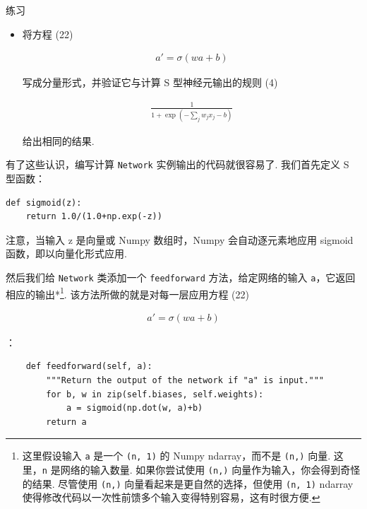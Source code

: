 \begin{exerciseBox}{练习}

\begin{itemize}

\item
将方程 (22)

\begin{align*}
a' = \sigma(w a + b) \nonumber
\end{align*}

写成分量形式，并验证它与计算 S 型神经元输出的规则 (4)

\begin{align*}
\frac{1}{1+\exp(-\sum_j w_j x_j-b)} \nonumber
\end{align*}

给出相同的结果.

\end{itemize}

有了这些认识，编写计算 \texttt{Network} 实例输出的代码就很容易了. 我们首先定义 S 型函数：

\begin{lstlisting}
def sigmoid(z):
    return 1.0/(1.0+np.exp(-z))

\end{lstlisting}

注意，当输入 z 是向量或 Numpy 数组时，Numpy 会自动逐元素地应用 sigmoid 函数，即以向量化形式应用.

然后我们给 \texttt{Network} 类添加一个 \texttt{feedforward} 方法，给定网络的输入 \texttt{a}，它返回相应的输出*\footnote{这里假设输入 \texttt{a} 是一个 \texttt{(n, 1)} 的 Numpy ndarray，而不是 \texttt{(n,)} 向量. 这里，\texttt{n} 是网络的输入数量. 如果你尝试使用 \texttt{(n,)} 向量作为输入，你会得到奇怪的结果. 尽管使用 \texttt{(n,)} 向量看起来是更自然的选择，但使用 \texttt{(n, 1)} ndarray 使得修改代码以一次性前馈多个输入变得特别容易，这有时很方便.}. 该方法所做的就是对每一层应用方程 (22)

\begin{align*}
a' = \sigma(w a + b) \nonumber
\end{align*}

\noindent：

\begin{lstlisting}
    def feedforward(self, a):
        """Return the output of the network if "a" is input."""
        for b, w in zip(self.biases, self.weights):
            a = sigmoid(np.dot(w, a)+b)
        return a

\end{lstlisting}


\end{exerciseBox}
